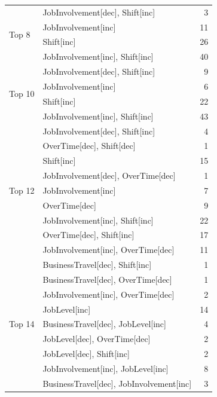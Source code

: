 \documentclass[a4paper,fleqn]{cas-sc}
\begin{document}
{\begin{longtable}{llr}
\multirow{4}{*}{Top 8}  & JobInvolvement[dec], Shift[inc]              & 3  \\
  & JobInvolvement[inc]                          & 11 \\
  & Shift[inc]                                   & 26 \\
  & JobInvolvement[inc], Shift[inc]               & 40 \\
\midrule
\multirow{4}{*}{Top 10} & JobInvolvement[dec], Shift[inc]              & 9  \\
 & JobInvolvement[inc]                          & 6  \\
 & Shift[inc]                                   & 22 \\
 & JobInvolvement[inc], Shift[inc]               & 43 \\
\midrule
\multirow{9}{*}{Top 12} & JobInvolvement[dec], Shift[inc]              & 4  \\
 & OverTime[dec], Shift[dec]                    & 1  \\
 & Shift[inc]                                   & 15 \\
 & JobInvolvement[dec], OverTime[dec]           & 1  \\
 & JobInvolvement[inc]                          & 7  \\
 & OverTime[dec]                                & 9  \\
 & JobInvolvement[inc], Shift[inc]               & 22 \\
 & OverTime[dec], Shift[inc]                    & 17 \\
 & JobInvolvement[inc], OverTime[dec]           & 11 \\
\midrule
\multirow{14}{*}{Top 14} & BusinessTravel[dec], Shift[inc]              & 1  \\
 & BusinessTravel[dec], OverTime[dec]           & 1  \\
 & JobInvolvement[inc], OverTime[dec]           & 2  \\
 & JobLevel[inc]                                & 14 \\
 & BusinessTravel[dec], JobLevel[inc]           & 4  \\
 & JobLevel[dec], OverTime[dec]                 & 2  \\
 & JobLevel[dec], Shift[inc]                    & 2  \\
 & JobInvolvement[inc], JobLevel[inc]           & 8  \\
 & BusinessTravel[dec], JobInvolvement[inc]     & 3  \\

\end{longtable}}
\end{document}
